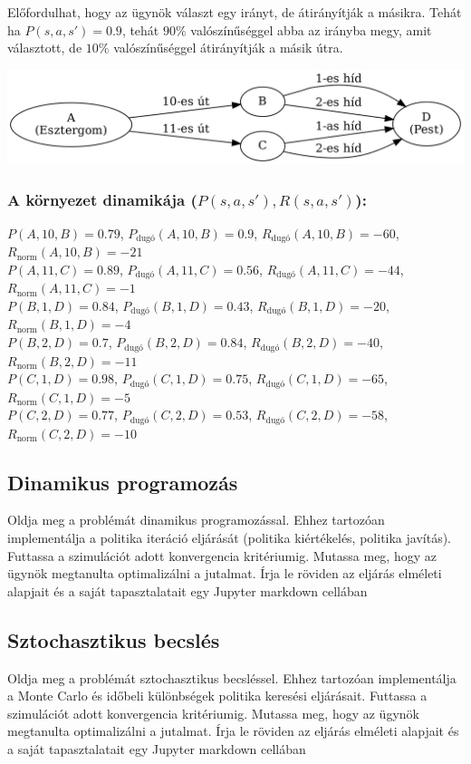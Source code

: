 \documentclass[english]{article}
\begin{document}
Előfordulhat, hogy az ügynök választ egy irányt, de átirányítják a másikra. Tehát ha $P(s,a,s') = 0.9$, tehát $90\%$ valószínűséggel abba az irányba megy, amit választott, de $10\%$ valószínűséggel átirányítják a másik útra.

\begin{center}
\includegraphics[width=\textwidth, keepaspectratio]{graphs/1_duna.png}
\end{center}

\subsubsection*{A környezet dinamikája ($P(s,a,s'), R(s,a,s')$):} 
$P(A,10,B)=0.79$, $P_\text{dugó}(A,10,B)=0.9$, $R_\text{dugó}(A,10,B)=-60$, $R_\text{norm}(A,10,B)=-21$\\
$P(A,11,C)=0.89$, $P_\text{dugó}(A,11,C)=0.56$, $R_\text{dugó}(A,11,C)=-44$, $R_\text{norm}(A,11,C)=-1$\\
$P(B,1,D)=0.84$, $P_\text{dugó}(B,1,D)=0.43$, $R_\text{dugó}(B,1,D)=-20$, $R_\text{norm}(B,1,D)=-4$\\
$P(B,2,D)=0.7$, $P_\text{dugó}(B,2,D)=0.84$, $R_\text{dugó}(B,2,D)=-40$, $R_\text{norm}(B,2,D)=-11$\\
$P(C,1,D)=0.98$, $P_\text{dugó}(C,1,D)=0.75$, $R_\text{dugó}(C,1,D)=-65$, $R_\text{norm}(C,1,D)=-5$\\
$P(C,2,D)=0.77$, $P_\text{dugó}(C,2,D)=0.53$, $R_\text{dugó}(C,2,D)=-58$, $R_\text{norm}(C,2,D)=-10$\\

\subsection{Dinamikus programozás}
Oldja meg a problémát dinamikus programozással. Ehhez tartozóan implementálja a politika iteráció eljárását (politika kiértékelés, politika javítás). Futtassa a szimulációt adott konvergencia kritériumig. Mutassa meg, hogy az ügynök megtanulta optimalizálni a jutalmat. Írja le röviden az eljárás elméleti alapjait és a saját tapasztalatait egy Jupyter markdown cellában

\subsection{Sztochasztikus becslés}
Oldja meg a problémát sztochasztikus becsléssel. Ehhez tartozóan implementálja a Monte Carlo és időbeli különbségek politika keresési eljárásait. Futtassa a szimulációt adott konvergencia kritériumig. Mutassa meg, hogy az ügynök megtanulta optimalizálni a jutalmat. Írja le röviden az eljárás elméleti alapjait és a saját tapasztalatait egy Jupyter markdown cellában
\end{document}
